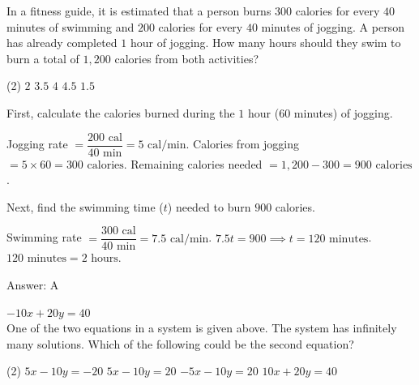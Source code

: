 \documentclass[11pt,paper=a4,answers]{exam}
\begin{document}
\begin{questions}
\vspace{1cm}

\question
In a fitness guide, it is estimated that a person burns $300$ calories for every $40$ minutes of swimming and $200$ calories for every $40$ minutes of jogging. A person has already completed $1$ hour of jogging. How many hours should they swim to burn a total of $1,200$ calories from both activities?
\begin{tasks}(2)
\task $2$
\task $3.5$
\task $4$
\task $4.5$
\task $1.5$
\end{tasks}

\begin{solution}
First, calculate the calories burned during the $1$ hour ($60$ minutes) of jogging.
\vspace{5pt}
\begin{center}
Jogging rate $= \dfrac{200 \text{ cal}}{40 \text{ min}} = 5 \text{ cal/min}$.
\vspace{5pt}
Calories from jogging $= 5 \times 60 = 300 \text{ calories}$.
\vspace{5pt}
Remaining calories needed $= 1,200 - 300 = 900 \text{ calories}$.
\end{center}
\vspace{5pt}
Next, find the swimming time ($t$) needed to burn $900$ calories.
\vspace{5pt}
\begin{center}
Swimming rate $= \dfrac{300 \text{ cal}}{40 \text{ min}} = 7.5 \text{ cal/min}$.
\vspace{5pt}
$7.5t = 900 \implies t = 120 \text{ minutes}$.
\vspace{5pt}
$120 \text{ minutes} = 2 \text{ hours}$.
\end{center}
\vspace{5pt}
Answer: \colorbox{yellow!100}{A}
\end{solution}

\vspace{1cm}

\question
$-10x + 20y = 40$ \\
One of the two equations in a system is given above. The system has infinitely many solutions. Which of the following could be the second equation?
\begin{center}
\end{center}
\begin{tasks}(2)
\task $5x - 10y = -20$
\task $5x - 10y = 20$
\task $-5x - 10y = 20$
\task $10x + 20y = 40$
\end{tasks}


\end{questions}
\end{document}
